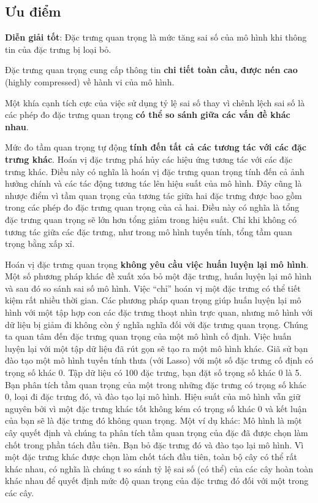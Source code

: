 \subsection{Ưu điểm}
\textbf{Diễn giải tốt}: Đặc trưng quan trọng là mức tăng sai số của mô hình khi thông tin của đặc trưng bị loại bỏ.

Đặc trưng quan trọng cung cấp thông tin \textbf{chi tiết toàn cầu, được nén cao} (highly compressed) về hành vi của mô hình.

Một khía cạnh tích cực của việc sử dụng tỷ lệ sai số thay vì chênh lệch sai số là các phép đo đặc trưng quan trọng \textbf{có thể so sánh giữa các vấn đề khác nhau}.

Mức đo tầm quan trọng tự động \textbf{tính đến tất cả các tương tác với các đặc trưng khác}. Hoán vị đặc trưng phá hủy các hiệu ứng tương tác với các đặc trưng khác. Điều này có nghĩa là hoán vị đặc trưng quan trọng tính đến cả ảnh hưởng chính và các tác động tương tác lên hiệu suất của mô hình. Đây cũng là nhược điểm vì tầm quan trọng của tương tác giữa hai đặc trưng được bao gồm trong các phép đo đặc trưng quan trọng của cả hai. Điều này có nghĩa là tổng đặc trưng quan trọng sẽ lớn hơn tổng giảm trong hiệu suất. Chỉ khi không có tương tác giữa các đặc trưng, như trong mô hình tuyến tính, tổng tầm quan trọng bằng xấp xỉ.

Hoán vị đặc trưng quan trọng \textbf{không yêu cầu việc huấn luyện lại mô hình}. Một số phương pháp khác đề xuất xóa bỏ một đặc trưng, huấn luyện lại mô hình và sau đó so sánh sai số mô hình. Việc ``chỉ'' hoán vị một đặc trưng có thể tiết kiệm rất nhiều thời gian. Các phương pháp quan trọng giúp huấn luyện lại mô hình với một tập hợp con các đặc trưng thoạt nhìn trực quan, nhưng mô hình với dữ liệu bị giảm đi không còn ý nghĩa nghĩa đối với đặc trưng quan trọng. Chúng ta quan tâm đến đặc trưng quan trọng của một mô hình cố định. Việc huấn luyện lại với một tập dữ liệu đã rút gọn sẽ tạo ra một mô hình khác. Giã sử bạn đào tạo một mô hình tuyến tính thưa (với Lasso) với một số đặc trưng cố định có trọng số khác 0. Tập dữ liệu có 100 đặc trưng, bạn đặt số trọng số khác 0 là 5. Bạn phân tích tầm quan trọng của một trong những đặc trưng có trọng số khác 0, loại đi đặc trưng đó, và đào tạo lại mô hình. Hiệu suất của mô hình vẫn giữ nguyên bởi vì một đặc trưng khác tốt không kém có trọng số khác 0 và kết luận của bạn sẽ là đặc trưng đó không quan trọng. Một ví dụ khác: Mô hình là một cây quyết định và chúng ta phân tích tầm quan trọng của đặc đã được chọn làm chốt trong phần tách đầu tiên. Bạn bỏ đặc trưng đó và đào tạo lại mô hình. Vì một đặc trưng khác được chọn làm chốt tách đầu tiên, toàn bộ cây có thể rất khác nhau, có nghĩa là chúng t so sánh tỷ lệ sai số (có thể) của các cây hoàn toàn khác nhau để quyết định mức độ quan trọng của đặc trưng đó đối với một trong các cây.

